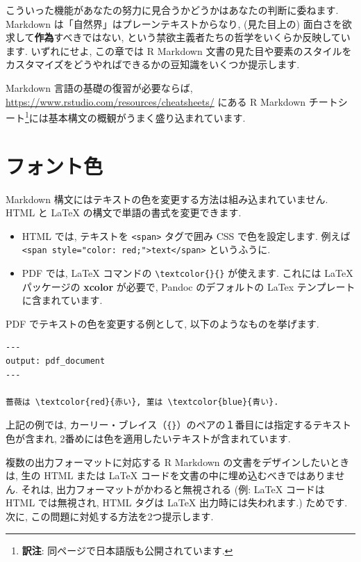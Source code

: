 \documentclass[
  11pt,
  lualatex,ja=standard,jafont=noto]{bxjsreport}
\begin{document}
こういった機能があなたの努力に見合うかどうかはあなたの判断に委ねます. Markdown は「自然界」はプレーンテキストからなり, (見た目上の) 面白さを欲求して\textbf{作為}すべきではない, という禁欲主義者たちの哲学をいくらか反映しています. いずれにせよ, この章では R Markdown 文書の見た目や要素のスタイルをカスタマイズをどうやればできるかの豆知識をいくつか提示します.

Markdown 言語の基礎の復習が必要ならば, \url{https://www.rstudio.com/resources/cheatsheets/} にある R Markdown チートシート\footnote{\textbf{訳注}: 同ページで日本語版も公開されています.}には基本構文の概観がうまく盛り込まれています.

\hypertarget{font-color}{%
\section{フォント色}\label{font-color}}

Markdown 構文にはテキストの色を変更する方法は組み込まれていません. HTML と LaTeX の構文で単語の書式を変更できます.

\begin{itemize}
\item
  HTML では, テキストを \texttt{\textless{}span\textgreater{}} タグで囲み CSS で色を設定します. 例えば \texttt{\textless{}span\ style="color:\ red;"\textgreater{}text\textless{}/span\textgreater{}} というふうに.
\item
  PDF では, LaTeX コマンドの \texttt{\textbackslash{}textcolor\{\}\{\}} が使えます. これには LaTeX パッケージの \textbf{xcolor} が必要で, Pandoc のデフォルトの LaTex テンプレートに含まれています.
\end{itemize}

PDF でテキストの色を変更する例として, 以下のようなものを挙げます.

\begin{verbatim}
---
output: pdf_document
---

薔薇は \textcolor{red}{赤い}, 菫は \textcolor{blue}{青い}.
\end{verbatim}

上記の例では, カーリー・ブレイス（\texttt{\{\}}）のペアの１番目には指定するテキスト色が含まれ, 2番めには色を適用したいテキストが含まれています.

複数の出力フォーマットに対応する R Markdown の文書をデザインしたいときは, 生の HTML または LaTeX コードを文書の中に埋め込むべきではありません. それは, 出力フォーマットがかわると無視される (例: LaTeX コードは HTML では無視され, HTML タグは LaTeX 出力時には失われます.) ためです. 次に, この問題に対処する方法を2つ提示します.
\end{document}
